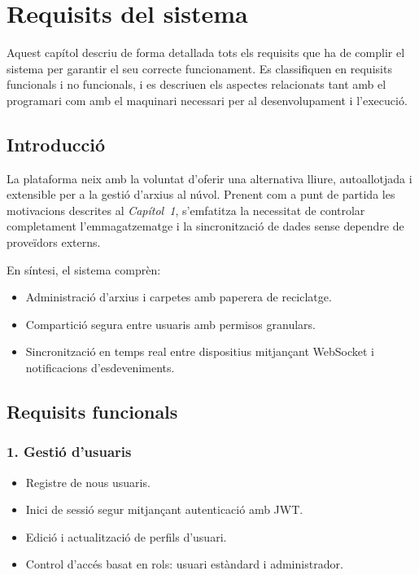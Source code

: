 \chapter{Requisits del sistema}

Aquest capítol descriu de forma detallada tots els requisits que ha de complir el sistema per garantir el seu correcte funcionament. Es classifiquen en requisits funcionals i no funcionals, i es descriuen els aspectes relacionats tant amb el programari com amb el maquinari necessari per al desenvolupament i l'execució.

\section{Introducció}
La plataforma neix amb la voluntat d'oferir una alternativa lliure, autoallotjada i extensible per a la gestió d'arxius al núvol. Prenent com a punt de partida les motivacions descrites al \textit{Capítol~1}, s'emfatitza la necessitat de controlar completament l'emmagatzematge i la sincronització de dades sense dependre de proveïdors externs.\par
En síntesi, el sistema comprèn:
\begin{itemize}
  \item Administració d'arxius i carpetes amb paperera de reciclatge.
  \item Compartició segura entre usuaris amb permisos granulars.
  \item Sincronització en temps real entre dispositius mitjançant WebSocket i notificacions d'esdeveniments.
\end{itemize}

\section{Requisits funcionals}

\subsection{1. Gestió d'usuaris}
\begin{itemize}
  \item Registre de nous usuaris.
  \item Inici de sessió segur mitjançant autenticació amb JWT.
  \item Edició i actualització de perfils d'usuari.
  \item Control d'accés basat en rols: usuari estàndard i administrador.
\end{itemize}

